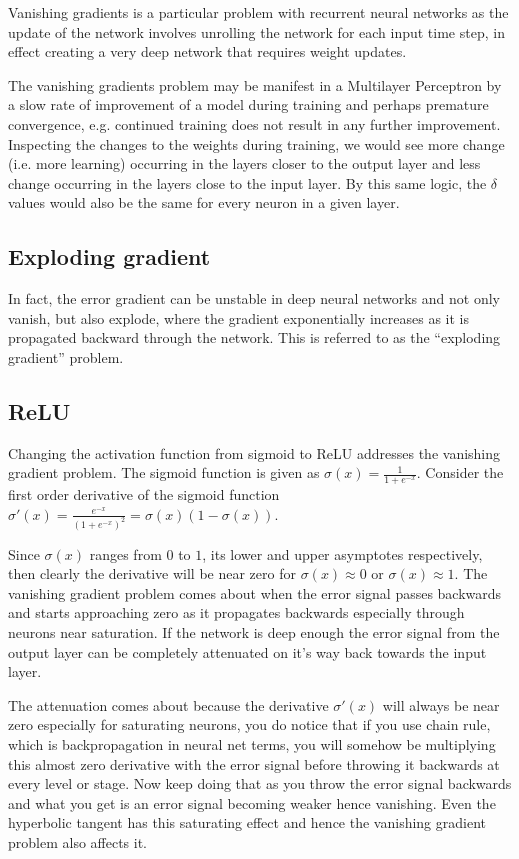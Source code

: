 \documentclass{article}
\begin{document}
Vanishing gradients is a particular problem with recurrent neural networks as the update of the network involves unrolling the network for each input time step, in effect creating a very deep network that requires weight updates.

The vanishing gradients problem may be manifest in a Multilayer Perceptron by a slow rate of improvement of a model during training and perhaps premature convergence, e.g. continued training does not result in any further improvement. Inspecting the changes to the weights during training, we would see more change (i.e. more learning) occurring in the layers closer to the output layer and less change occurring in the layers close to the input layer.
By this same logic, the $\delta$ values would also be the same for every neuron in a given layer.

\subsection{Exploding gradient}

In fact, the error gradient can be unstable in deep neural networks and not only vanish, but also explode, where the gradient exponentially increases as it is propagated backward through the network. This is referred to as the ``exploding gradient'' problem.

\subsection{ReLU}
Changing the activation function from sigmoid to ReLU addresses the vanishing gradient problem.
The sigmoid function is given as $\sigma(x) = \frac{1}{1 + e^{-x}}$.  Consider the first order derivative of the sigmoid function $\sigma'(x) = \frac{e^{-x}}{(1 + e^{-x})^2} = \sigma(x)(1-\sigma(x))$.

Since  $\sigma(x)$  ranges from $0$ to $1$, its lower and upper asymptotes respectively, then clearly the derivative will be near zero for $\sigma(x) \approx 0$ or $\sigma(x) \approx 1$. The vanishing gradient problem comes about when the error signal passes backwards and starts approaching zero as it propagates backwards especially through neurons near saturation. If the network is deep enough the error signal from the output layer can be completely attenuated on it's way back towards the input layer.

The attenuation comes about because the derivative $\sigma'(x)$ will always be near zero especially for saturating neurons, you do notice that if you use chain rule, which is backpropagation in neural net terms, you will somehow be multiplying this almost zero derivative with the error signal before throwing it backwards at every level or stage. Now keep doing that as you throw the error signal backwards and what you get is an error signal becoming weaker hence vanishing. Even the hyperbolic tangent has this saturating effect and hence the vanishing gradient problem also affects it.
\end{document}
